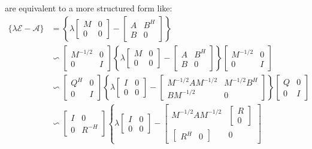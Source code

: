 \documentclass[]{book}
\theoremstyle{definition}
\theoremstyle{definition}
\theoremstyle{definition}
\theoremstyle{definition}
\theoremstyle{remark}
\begin{document}
are equivalent to a more structured form like:
\begin{align*}
\{\lambda \mathcal E - \mathcal A\} &=
\left\{\lambda 
\begin{bmatrix} M & 0 \\ 0 & 0 \end{bmatrix}
-
\begin{bmatrix} A & B^H \\ B & 0 \end{bmatrix}
\right\} \\
& \backsim 
\begin{bmatrix} M^{-1/2} & 0 \\ 0 & I \end{bmatrix}
\left\{\lambda
\begin{bmatrix} M & 0 \\ 0 & 0 \end{bmatrix}
-
\begin{bmatrix} A & B^H \\ B & 0 \end{bmatrix}
\right\} 
\begin{bmatrix} M^{-1/2} & 0 \\ 0 & I \end{bmatrix} \\
& \backsim 
\begin{bmatrix} Q^H & 0 \\ 0 & I \end{bmatrix}
\left\{\lambda 
\begin{bmatrix} I & 0 \\ 0 & 0 \end{bmatrix}
-
\begin{bmatrix} M^{-1/2}AM^{-1/2} &  M^{-1/2}B^H \\ B M^{-1/2} & 0 \end{bmatrix}
\right\}
\begin{bmatrix} Q & 0 \\ 0 & I \end{bmatrix} \\
& \backsim 
\begin{bmatrix} I & 0 \\ 0 & R^{-H} \end{bmatrix}
\left\{ \lambda
\begin{bmatrix} I & 0 \\ 0 & 0 \end{bmatrix}
-
\begin{bmatrix} M^{-1/2}AM^{-1/2} &  \begin{bmatrix} R \\ 0 \end{bmatrix} \\ \begin{bmatrix}R^H & 0\end{bmatrix} & 0 \end{bmatrix}

\end{align*}
\end{document}
